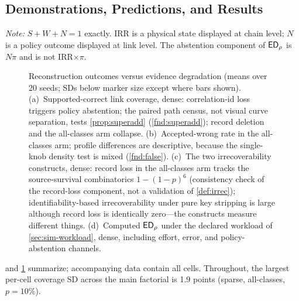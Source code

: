 \subsection{Demonstrations, Predictions, and Results}
\label{sec:sim-results}

\begin{table}[t]
\centering
\caption{Selected Results, Generated Programmatically from the Run Outputs
(Means over 20 Seeds; SDs Are in the Accompanying CSV). $S/W/N$ = Fractions of All
Required Links; FRR = $W/(S+W)$; IRR$_{ch}$ = Physically Irrecoverable Chains;
ERC = Declared Effort Units; $\ED_\rho$ = Computed Policy-Specific Burden}
\label{tab:results}
\scriptsize

\par\vspace{2pt}
\begin{minipage}{0.98\textwidth}\footnotesize
\emph{Note:} $S+W+N=1$ exactly. IRR is a physical state displayed at chain level;
$N$ is a policy outcome displayed at link level. The abstention component of
$\ED_\rho$ is $N\pi$ and is not IRR$\times\pi$.
\end{minipage}
\end{table}

\begin{figure}[t]
\centering

\caption{Reconstruction outcomes versus evidence degradation (means over 20
seeds; SDs below marker size except where bars shown). (a)~Supported-correct
link coverage, dense: correlation-id loss triggers policy abstention; the paired
path census, not visual curve separation, tests \cref{prop:superadd}
(\cref{fnd:superadd}); record deletion and the all-classes arm collapse.
(b)~Accepted-wrong rate in the all-classes arm; profile differences are descriptive,
because the single-knob density test is mixed (\cref{fnd:false}). (c)~The two irrecoverability constructs, dense:
record loss in the all-classes arm tracks the source-survival combinatorics
$1-(1-p)^{6}$ (consistency check of the record-loss component, not a
validation of \cref{def:irrec}); identifiability-based irrecoverability under
pure key stripping is large although record loss is identically zero---the
constructs measure different things. (d)~Computed $\ED_\rho$ under the declared
workload of \cref{sec:sim-workload}, dense, including effort, error, and
policy-abstention channels.}
\label{fig:results}
\end{figure}

 and \cref{fig:results} summarize; accompanying data contain all
cells. Throughout, the largest per-cell coverage SD across the main factorial
is 1.9 points (sparse, all-classes, $p{=}10\%$).

